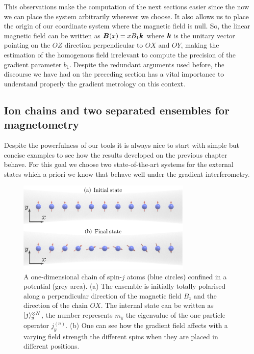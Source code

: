 This observations make the computation of the next sections easier since the now we can place the system arbitrarily wherever we choose.
It also allows us to place the origin of our coordinate system where the magnetic field is null.
So, the linear magnetic field can be written as $\boldsymbol{B}(x)= xB_1\boldsymbol{k}$ where $\boldsymbol{k}$ is the unitary vector pointing on the $OZ$ direction perpendicular to $OX$ and $OY$, making the estimation of the homogenous field irrelevant to compute the precision of the gradient parameter $b_1$.
Despite the redundant arguments used before, the discourse we have had on the preceding section has a vital importance to understand properly the gradient metrology on this context.


\subsection{Ion chains and two separated ensembles for magnetometry}
\label{sec:twin cloud systems}

Despite the powerfulness of our tools it is always nice to start with simple but concise examples to see how the results developed on the previous chapter behave.
For this goal we choose two state-of-the-art systems for the external states which a priori we know that behave well under the gradient interferometry.

\begin{figure}[htp]
\begin{center}
\includegraphics[width=244pt]{img/tp-density.pdf}
\caption{A one-dimensional chain of spin-$j$ atoms (blue
circles) confined in a potential (grey area).
(a) The ensemble is initially totally polarised along a
perpendicular direction of the magnetic field $B_z$ and the direction of the chain $OX$.
The internal state can be written as $\vert j \rangle_{y}^{\otimes N}$, the number represents $m_y$ the eigenvalue of the one particle operator $j_y^{(n)}$.
(b) One can see how the gradient field affects with a varying field strength the different spins when they are placed in different positions. }
\label{fig:ionchain-evolution}
\end{center}
\end{figure}


